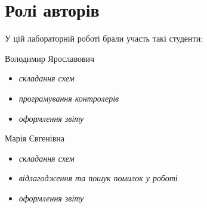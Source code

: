 \chapter{Ролі авторів} 

У цій лабораторній роботі брали участь такі студенти:
\begin{itemize}
 Володимир Ярославович
\begin{itemize}
    \item\textit{складання схем}
    \item\textit{програмування контролерів}
    \item\textit{оформлення звіту}
\end{itemize}
 Марія Євгенівна
\begin{itemize}
    \item\textit{складання схем}
    \item\textit{відлагодження та пошук помилок у роботі}
    \item\textit{оформлення звіту}

\end{itemize}
\end{itemize}